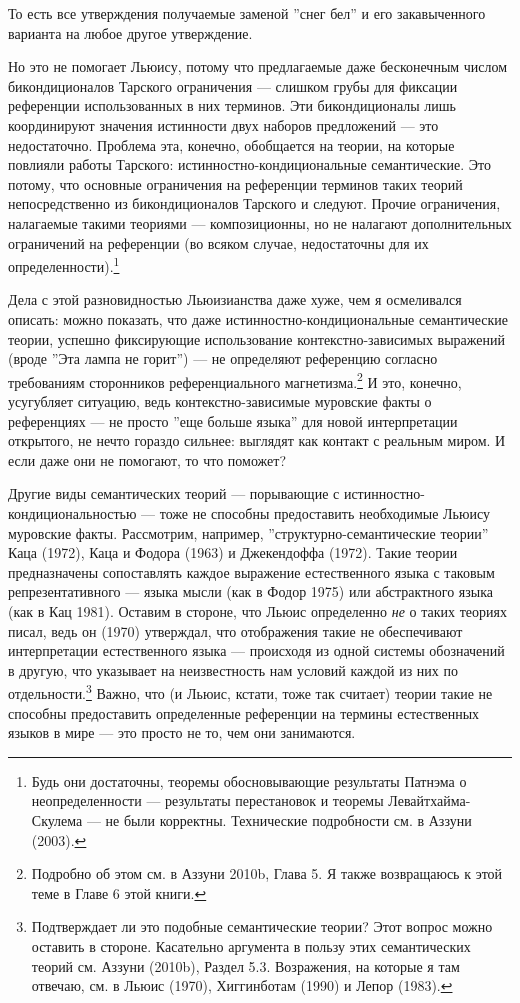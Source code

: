 \documentclass[11pt]{book}
\begin{document}
То есть все утверждения получаемые заменой ''снег бел'' и его закавыченного варианта на любое другое утверждение.

Но это не помогает Льюису, потому что предлагаемые даже бесконечным числом бикондиционалов Тарского ограничения --- слишком грубы для фиксации референции использованных в них терминов. Эти бикондиционалы лишь координируют значения истинности двух наборов предложений --- это недостаточно. Проблема эта, конечно, обобщается на теории, на которые повлияли работы Тарского: истинностно-кондициональные семантические. Это потому, что основные ограничения на референции терминов таких теорий непосредственно из бикондиционалов Тарского и следуют. Прочие ограничения, налагаемые такими теориями --- композиционны, но не налагают дополнительных ограничений на референции (во всяком случае, недостаточны для их определенности).\footnote{Будь они достаточны, теоремы обосновывающие результаты Патнэма о неопределенности --- результаты перестановок и теоремы Левайтхайма-Скулема --- не были корректны. Технические подробности см. в Аззуни (2003).}

Дела с этой разновидностью Льюизианства даже хуже, чем я осмеливался описать: можно показать, что даже истинностно-кондициональные семантические теории, успешно фиксирующие использование контекстно-зависимых выражений (вроде ''Эта лампа не горит'') --- не определяют референцию согласно требованиям сторонников референциального магнетизма.\footnote{Подробно об этом см. в Аззуни 2010b, Глава 5. Я также возвращаюсь к этой теме в Главе 6 этой книги.} И это, конечно, усугубляет ситуацию, ведь контекстно-зависимые муровские факты о референциях --- не просто ''еще больше языка'' для новой интерпретации открытого, не нечто гораздо сильнее: выглядят как контакт с реальным миром. И если даже они не помогают, то что поможет?

Другие виды семантических теорий --- порывающие с истинностно-кондициональностью --- тоже не способны предоставить необходимые Льюису муровские факты. Рассмотрим, например, ''структурно-семантические теории'' Каца (1972), Каца и Фодора (1963) и Джекендоффа (1972). Такие теории предназначены сопоставлять каждое выражение естественного языка с таковым репрезентативного --- языка мысли (как в Фодор 1975) или абстрактного языка (как в Кац 1981). Оставим в стороне, что Льюис определенно \textit{не} о таких теориях писал, ведь он (1970) утверждал, что отображения такие не обеспечивают интерпретации естественного языка --- происходя из одной системы обозначений в другую, что указывает на неизвестность нам условий каждой из них по отдельности.\footnote{Подтверждает ли это подобные семантические теории? Этот вопрос можно оставить в стороне. Касательно аргумента в пользу этих семантических теорий см. Аззуни (2010b), Раздел 5.3. Возражения, на которые я там отвечаю, см. в Льюис (1970), Хиггинботам (1990) и Лепор (1983).} Важно, что (и Льюис, кстати, тоже так считает) теории такие не способны предоставить определенные референции на термины естественных языков в мире --- это просто не то, чем они занимаются.
\end{document}
